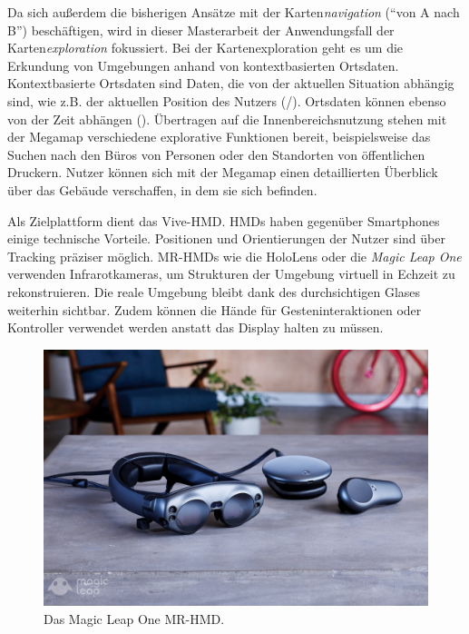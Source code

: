 Da sich außerdem die bisherigen Ansätze mit der Karten\emph{navigation} (\enquote{von A nach B}) beschäftigen, wird in dieser Masterarbeit der Anwendungsfall der Karten\emph{exploration} fokussiert.
Bei der Kartenexploration geht es um die Erkundung von Umgebungen anhand von kontextbasierten Ortsdaten.
Kontextbasierte Ortsdaten sind Daten, die von der aktuellen Situation abhängig sind, wie z.B. der aktuellen Position des Nutzers (/).
Ortsdaten können ebenso von der Zeit abhängen ().
Übertragen auf die Innenbereichsnutzung stehen mit der Megamap verschiedene explorative Funktionen bereit, beispielsweise das Suchen nach den Büros von Personen oder den Standorten von öffentlichen Druckern.
Nutzer können sich mit der Megamap einen detaillierten Überblick über das Gebäude verschaffen, in dem sie sich befinden.

Als Zielplattform dient das Vive-HMD.
HMDs haben gegenüber Smartphones einige technische Vorteile.
Positionen und Orientierungen der Nutzer sind über Tracking präziser möglich.
MR-HMDs wie die HoloLens oder die \emph{Magic Leap One} \parencite[siehe \autoref{fig:magic_leap}]{MagicLeap2018} verwenden Infrarotkameras, um Strukturen der Umgebung virtuell in Echzeit zu rekonstruieren.
Die reale Umgebung bleibt dank des durchsichtigen Glases weiterhin sichtbar.
Zudem können die Hände für Gesteninteraktionen oder Kontroller verwendet werden anstatt das Display halten zu müssen.
\begin{figure}[tb]
    \centering
    \includegraphics[trim={0, 7cm, 0, 7cm}, clip, width=\textwidth]{figures/magicleap}
    \caption{Das Magic Leap One MR-HMD. }
    \label{fig:magic_leap}
\end{figure}

